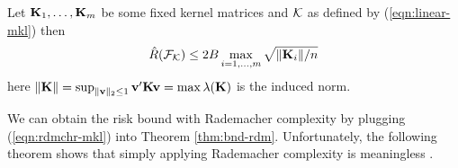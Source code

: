 \begin{theorem} \label{thm:rbd-mkl}
\cite[Theorem 2]{nips/BousquetH02}Let ${\mathbf K}_1, \ldots, {\mathbf K}_m$ be some fixed kernel
matrices and ${\cal K}$ as defined by (\ref{eqn:linear-mkl}) then
\begin{equation}
\hat{R}(\f_\k) \leq 2B\max_{i=1,\ldots,m} \sqrt{\| \K_i \| / n}  \label{eqn:rdmchr-mkl}
\end{equation}
here $\|{\mathbf K}\| = \sup_{\| \mathbf v \|_2 \leq 1}\mathbf v' {\mathbf K} \mathbf v = \max
\lambda({\mathbf K})$ is the induced norm.
\end{theorem}
%

We can obtain the risk bound with Rademacher complexity by plugging
(\ref{eqn:rdmchr-mkl}) into Theorem \ref{thm:bnd-rdm}. Unfortunately, the
following theorem shows that simply applying Rademacher complexity is meaningless \cite{colt/SrebroB06}.

